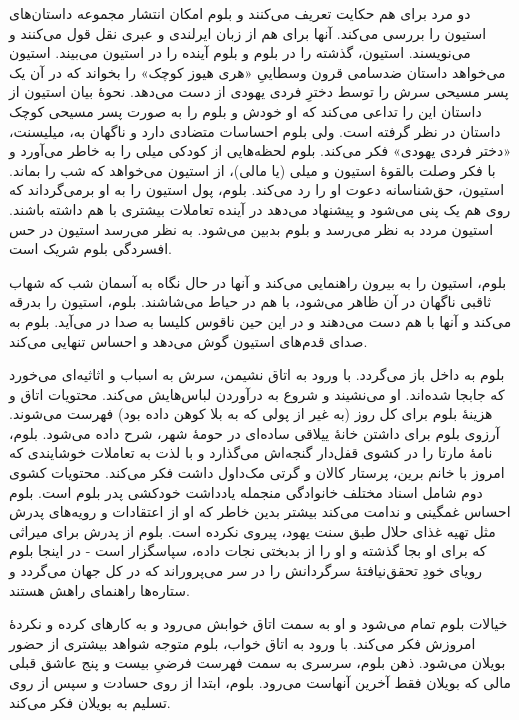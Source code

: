 \documentclass[12pt]{book}
\begin{document}
    دو مرد برای هم حکایت تعریف می‌کنند و بلوم امکان انتشار مجموعه داستان‌های استیون را بررسی می‌کند. آنها برای هم از زبان ایرلندی و عبری نقل قول می‌کنند و می‌نویسند. استیون، گذشته را در بلوم و بلوم آینده را در استیون می‌بیند. استیون می‌خواهد داستان ضدسامی قرون وسطاییِ «هری هیوز کوچک» را بخواند که در آن یک پسر مسیحی سرش را توسط دخترِ فردی یهودی از دست می‌دهد. نحوۀ بیان استیون از داستان این را تداعی می‌کند که او خودش و بلوم را به صورت پسر مسیحی کوچک داستان در نظر گرفته است. ولی بلوم احساسات متضادی دارد و ناگهان به، میلیسنت، «دختر فردی یهودی» فکر می‌کند. بلوم لحظه‌هایی از کودکی میلی را به خاطر می‌آورد و با فکر وصلت بالقوۀ استیون و میلی (یا مالی)، از استیون می‌خواهد که شب را بماند. استیون، حق‌شناسانه دعوت او را رد می‌کند. بلوم، پول استیون را به او برمی‌گرداند که روی هم یک پنی می‌شود و پیشنهاد می‌دهد در آینده تعاملات بیشتری با هم داشته باشند. استیون مردد به نظر می‌رسد و بلوم بدبین می‌شود. به نظر می‌رسد استیون در حس افسردگی بلوم شریک است.

    بلوم، استیون را به بیرون راهنمایی می‌کند و آنها در حال نگاه به آسمان شب که شهاب ثاقبی ناگهان در آن ظاهر می‌شود، با هم در حیاط می‌شاشند. بلوم، استیون را بدرقه می‌کند و آنها با هم دست می‌دهند و در این حین ناقوس کلیسا به صدا در می‌آید. بلوم به صدای قدم‌های استیون گوش می‌دهد و احساس تنهایی می‌کند.

    بلوم به داخل باز می‌گردد. با ورود به اتاق نشیمن، سرش به اسباب و اثاثیه‌ای می‌خورد که جابجا شده‌اند. او می‌نشیند و شروع به درآوردن لباس‌هایش می‌کند. محتویات اتاق و هزینۀ بلوم برای کل روز (به غیر از پولی که به بلا کوهن داده بود) فهرست می‌شوند. آرزوی بلوم برای داشتن خانۀ ییلاقی ساده‌ای در حومۀ شهر، شرح داده می‌شود. بلوم، نامۀ مارتا را در کشوی قفل‌دار گنجه‌اش می‌گذارد و با لذت به تعاملات خوشایندی که امروز با خانم برین، پرستار کالان و گرتی مک‌داول داشت فکر می‌کند. محتویات کشوی دوم شامل اسناد مختلف خانوادگی منجمله یادداشت خودکشی پدر بلوم است. بلوم احساس غمگینی و ندامت می‌کند بیشتر بدین خاطر که او از اعتقادات و رویه‌های پدرش مثل تهیه غذای حلال طبق سنت یهود، پیروی نکرده است. بلوم از پدرش برای میراثی که برای او بجا گذشته و او را از بدبختی نجات داده، سپاسگزار است - در اینجا بلوم رویای خودِ تحقق‌نیافتۀ سرگردانش را در سر می‌پروراند که در کل جهان می‌گردد و ستاره‌ها راهنمای راهش هستند.

    خیالات بلوم تمام می‌شود و او به سمت اتاق خوابش می‌رود و به کارهای کرده و نکردۀ امروزش فکر می‌کند. با ورود به اتاق خواب، بلوم متوجه شواهد بیشتری از حضور بویلان می‌شود. ذهن بلوم، سرسری به سمت فهرست فرضیِ بیست و پنج عاشق قبلی مالی که بویلان فقط آخرین آنهاست می‌رود. بلوم، ابتدا از روی حسادت و سپس از روی تسلیم به بویلان فکر می‌کند.
\end{document}
